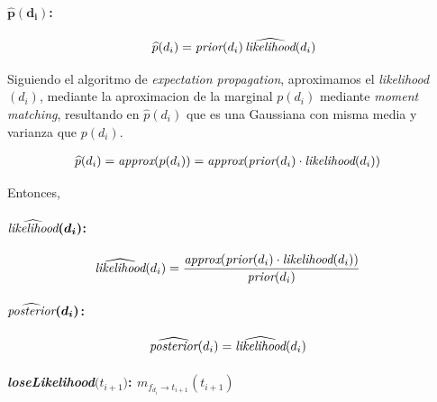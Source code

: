 \documentclass[11pt,twoside, spanish]{report} %
\begin{document}
\paragraph{$\bm{\widehat{p}(d_i)}$:}

\begin{equation}
\widehat{p}(d_i) = \emph{prior}(d_i) \, \widehat{\emph{likelihood}}(d_i)
\end{equation}

Siguiendo el algoritmo de \textit{expectation propagation}, aproximamos el \emph{likelihood}$(d_i)$, mediante la aproximacion de la marginal $p(d_i)$ mediante \textit{moment matching}, resultando en $\widehat{p}(d_i)$ que es una Gaussiana con misma media y varianza que $p(d_i)$.

\begin{equation}
\begin{split}
\widehat{p}(d_i) & = \emph{approx}(p(d_i)) = \emph{approx}(\emph{prior}(d_i) \cdot \emph{likelihood}(d_i))
\end{split}
\end{equation}

Entonces,
\paragraph{$\bm{\widehat{\emph{likelihood}}(d_i)}$:}

\begin{equation}
\begin{split}
\widehat{\emph{likelihood}}(d_i) &= \frac{\emph{approx}(\emph{prior}(d_i) \cdot \emph{likelihood}(d_i))}{ \emph{prior}(d_i)}
\end{split}
\end{equation}

\paragraph{$\bm{\widehat{\emph{posterior}}(d_i)}$:}


\begin{equation}
\begin{split}
\widehat{\emph{posterior}}(d_i) &= \widehat{\emph{likelihood}}(d_i)
\end{split}
\end{equation}

\paragraph{\emph{loseLikelihood}$\bm(t_{i+1})$: $m_{f_{d_i} \rightarrow t_{i+1}}(t_{i+1})$}
\end{document}
